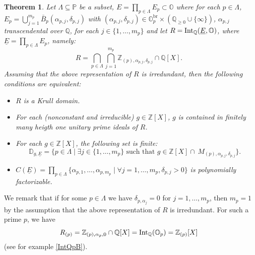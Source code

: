 \documentclass[10pt]{article}
\numberwithin{equation}{section}
\newtheorem{Thm}[equation]{Theorem}
\theoremstyle{definition}
\theoremstyle{definition}
\newcommand{\Q}{\mathbb{Q}}
\newcommand{\Z}{\mathbb{Z}}
\renewcommand{\O}{\mathbb{O}}
\newcommand{\PP}{\mathbb{P}}
\newcommand{\Int}{\textnormal{Int}}
\newcommand{\IntQ}{\Int_{\Q}}
\newcommand{\uE}{\underline{E}}
\newcommand{\br}{\text{br}}
\begin{document}
\begin{Thm}\label{Krull domains finite character}
 Let $\Lambda \subseteq \PP$ be a subset,  $E=\prod\limits_{p\in\Lambda}E_p\subset\O$ where for each $p\in\Lambda$, $E_p=\bigcup\limits_{j=1}^{m_p}\bar B_p(\alpha_{p,j},\delta_{p,j})$ with $(\alpha_{p,j},\delta_{p,j})\in\O_p^{\br}\times(\Q_{\geq0}\cup\{\infty\})$, $\alpha_{p,j}$ transcendental over $\Q$, for each 
$j\in\{1,\ldots,m_p\}$ and let $R=\IntQ(\uE,\O)$, where $\uE=\prod\limits_{p\in\Lambda}E_p$, namely:
$$R=\bigcap_{p\in\Lambda}\bigcap_{j=1}^{m_p}\Z_{(p),\alpha_{p,j},\delta_{p,j}}\cap\Q[X].$$
Assuming that the above representation of $R$ is irredundant, 
then the following conditions are equivalent:
\begin{itemize}
    \item[{\em (1)}] $R$ is a Krull domain.
    \item[{\em (2)}] For each (nonconstant and irreducible) $g\in\Z[X]$, $g$ is contained in finitely many heigth one unitary prime ideals of $R$.
   \item[{\em (3)}]  For each $g\in\Z[X]$, the following set is finite:
$$\mathbb D_{g,\uE}=\{p\in\Lambda \mid\exists j\in\{1,\ldots,m_p\} \text{ such that }g\in\Z[X]\cap\ M_{(p),\alpha_{p,j},\delta_{p,j}}\}.$$
\item[{\em (4)}] $C(\uE)=\prod\limits_{p\in\Lambda}\{\alpha_{p,1},\ldots,\alpha_{p,m_p}\mid \forall j=1,\ldots,m_p,\delta_{p,j}>0\}$ is polynomially factorizable.
\end{itemize}
 \end{Thm}
We remark that if for some $p\in\Lambda$ we have $\delta_{p,\alpha_j}=0$ for $j=1,\ldots,m_p$, then $m_p=1$ by the assumption that the above  representation of $R$ is irredundant. For such a prime $p$, we have 
  $$R_{(p)}=\Z_{(p),\alpha_p,0}\cap\Q[X]=\IntQ(\O_p)=\Z_{(p)}[X]$$ (see for example \eqref{IntQpB}). 
\end{document}
